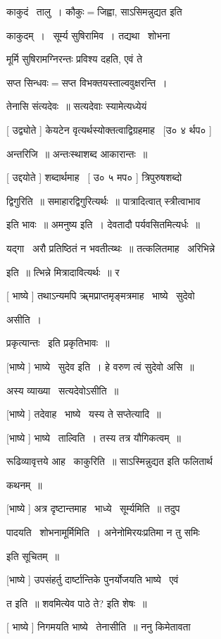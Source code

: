 \documentclass[11pt, openany]{book}
\begin{document}
काकुदं \textendash\ तालु~। कौकुः$=$जिह्वा, साऽसिमन्नुद्यत इति \textendash\ 

काकुदम्~। \textendash\ सूर्म्य सुषिरामिव~। तद्यथा \textendash\ शोभना \textendash\ 

मूर्मि सुषिरामग्निरन्तः प्रविश्य दहति, एवं ते 

सप्त सिन्धवः$=$सप्त विभक्तयस्ताल्ववुक्षरन्ति~। 

तेनासि संत्यदेवः~॥ सत्यदेवाः स्यामेत्यध्येयं 

[ उद्व्योते ] केयटेन वृत्यर्थस्योक्तत्वाद्विग्रहमाह \textendash\ [उ० ४ र्थप०
] 

अन्तरिजि~॥ अन्तःस्थाशब्द आकारान्तः~॥ 

[ उद्दयोते ] शब्दार्थमाह \textendash\ [ उ० ५ मप० ] त्रिपुरुषशब्दो 

द्विगुरिति~॥ समाहारद्विगुरित्यर्थः~॥ पात्रादित्वात् स्त्रीत्वाभाव 

इति भावः~॥ अमनुष्य इति~। देवतादौ पर्यवसितमित्यर्धः~॥ 

यद्गा \textendash\ अरौ प्रतिष्ठितं न भवतीत्य्थः~॥ तत्कलितमाह \textendash\ अरिभिन्ने 

इति~॥ त्भिन्ने मित्रादावित्यर्थः~॥ र 

[ भाष्ये ] तथाऽन्यमपि ऋ्मप्राप्तमृङ्मत्रमाह \textendash\ भाष्ये \textendash\ सुदेवो 

असीति~। {\qt प्रकृत्यान्तः \textendash\ इति प्रकृतिभावः~॥ 

[भाष्ये ] भाष्ये \textendash\ सुदेव इति~। हे वरुण त्वं सुदेवो असि~॥ 

अस्य व्याख्या \textendash\ सत्यदेवोऽसीति~॥ 

[भाष्ये ] तदेवाह \textendash\ भाष्ये \textendash\ यस्य ते सप्तेत्यादि~॥ 

[भाष्ये ] भाष्ये \textendash\ ताल्विति~। तस्य तत्र यौगिकत्वम्~॥ 

रूढिव्यावृत्तये आह \textendash\ काकुरिति~॥ साऽस्मिन्नुद्यत इति फलितार्थ \textendash\ }

कथनम्~॥ 

[भाष्ये ] अत्र दृष्टान्तमाह \textendash\ भाध्ये \textendash\ सूर्म्यमिति~॥ तदुप \textendash\ 

पादयति \textendash\ शोभनामूर्मिमिति~। अनेनोमिरयःप्रतिमा न तु समिः 

इति सूचितम्~॥ 

[भाष्ये ] उपसंहर्तु दार्ष्टान्तिके पुनर्योजयति भाष्ये \textendash\ एवं 

त इति~॥ शवमित्येव पाठे ते? इति शेषः~॥ 

[ भाष्ये ] निगमयति भाष्ये \textendash\ तेनासीति~॥ ननु किमेतावता \textendash\ 
\end{document}
